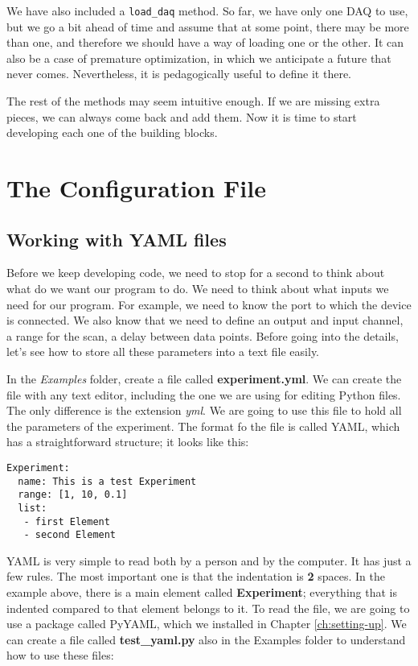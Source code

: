 We have also included a \texttt{load\_daq} method. So far, we have only one DAQ to use, but we go a bit ahead of time and assume that at some point, there may be more than one, and therefore we should have a way of loading one or the other. It can also be a case of premature optimization, in which we anticipate a future that never comes. Nevertheless, it is pedagogically useful to define it there.

The rest of the methods may seem intuitive enough. If we are missing extra pieces, we can always come back and add them. Now it is time to start developing each one of the building blocks.

\section{The Configuration File}\label{section:configuration-file}
\subsection{Working with YAML files}\label{subsection:yaml-files}
Before we keep developing code, we need to stop for a second to think about what do we want our program to do. We need to think about what inputs we need for our program. For example, we need to know the port to which the device is connected. We also know that we need to define an output and input channel, a range for the scan, a delay between data points. Before going into the details, let's see how to store all these parameters into a text file easily.

In the \emph{Examples} folder, create a file called \textbf{experiment.yml}. We can create the file with any text editor, including the one we are using for editing Python files. The only difference is the extension \emph{yml}. We are going to use this file to hold all the parameters of the experiment. The format fo the file is called {YAML}, which has a straightforward structure; it looks like this:

\begin{verbatim}
Experiment:
  name: This is a test Experiment
  range: [1, 10, 0.1]
  list:
   - first Element
   - second Element
\end{verbatim}

{YAML} is very simple to read both by a person and by the computer. It has just a few rules. The most important one is that the indentation is \textbf{2} spaces. In the example above, there is a main element called \textbf{Experiment}; everything that is indented compared to that element belongs to it. To read the file, we are going to use a package called PyYAML, which we installed in Chapter \ref{ch:setting-up}. We can create a file called \textbf{test\_yaml.py} also in the Examples folder to understand how to use these files:

